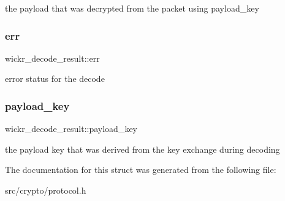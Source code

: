 the payload that was decrypted from the packet using payload\+\_\+key \mbox{\label{structwickr__decode__result_a63449a59c8a8bab451f5ab555be7895d}} 
\subsubsection{\texorpdfstring{err}{err}}
{\footnotesize\ttfamily wickr\+\_\+decode\+\_\+result\+::err}

error status for the decode \mbox{\label{structwickr__decode__result_aed31d598b49bf696f286d673246d8b31}} 
\subsubsection{\texorpdfstring{payload\+\_\+key}{payload\_key}}
{\footnotesize\ttfamily wickr\+\_\+decode\+\_\+result\+::payload\+\_\+key}

the payload key that was derived from the key exchange during decoding 

The documentation for this struct was generated from the following file\+:\begin{DoxyCompactItemize}
\item 
src/crypto/protocol.\+h\end{DoxyCompactItemize}
